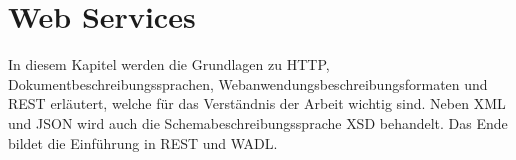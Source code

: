 \chapter{Web Services}
\label{chap:web_services}


In diesem Kapitel werden die Grundlagen zu HTTP, Dokumentbeschreibungssprachen, Webanwendungsbeschreibungsformaten und \gls{REST} erläutert, welche für das Verständnis der Arbeit wichtig sind. 
Neben \gls{XML} und  \gls{JSON} wird auch die Schemabeschreibungssprache \gls{XSD} behandelt.
Das Ende bildet die Einführung in \gls{REST} und \gls{WADL}.









